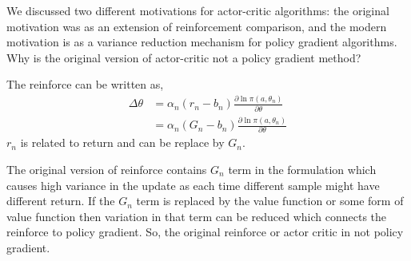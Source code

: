\documentclass[solution,addpoints,12pt]{exam}
\begin{document}
\begin{questions}
\question[3] We discussed two different motivations for actor-critic algorithms: the original motivation was as an extension of reinforcement comparison, and the modern motivation is as a variance reduction mechanism for policy gradient algorithms. Why is the original version
of actor-critic not a policy gradient method?
\begin{solution}
The reinforce can be written as,
\begin{equation}
\begin{aligned}
\Delta \theta &= \alpha_n (r_n - b_n) \frac{\partial \ln \pi(a,\theta_n)}{\partial \theta}\\
&= \alpha_n (G_n - b_n) \frac{\partial \ln \pi(a,\theta_n)}{\partial \theta}
\end{aligned}
\end{equation}
$r_n$ is related to return and can be replace by $G_n$.

The original version of reinforce contains $G_n$ term in  the formulation  which causes high variance in the update as each time different sample might have different return. 
If the $G_n$ term is replaced by the value function or some form of value function then variation in that term can be reduced which connects the reinforce to policy gradient. So, the original reinforce or actor critic in not policy gradient.
\end{solution}



\end{questions}
\end{document}
